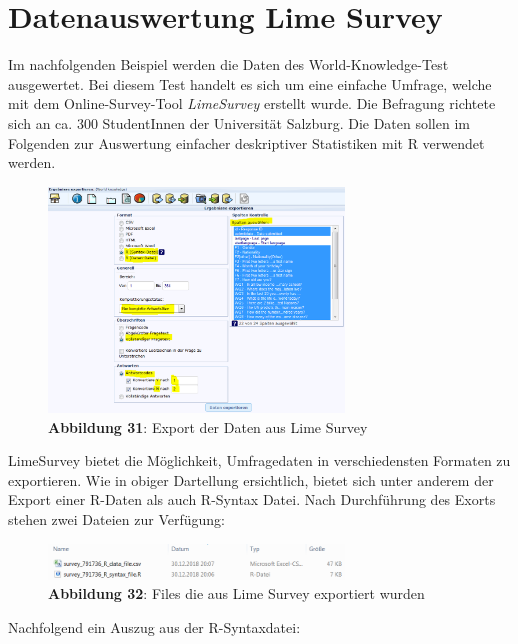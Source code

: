 \documentclass[]{article}
\begin{document}
\section{Datenauswertung Lime Survey}\label{datenauswertung-lime-survey}

Im nachfolgenden Beispiel werden die Daten des World-Knowledge-Test
ausgewertet. Bei diesem Test handelt es sich um eine einfache Umfrage,
welche mit dem Online-Survey-Tool \emph{LimeSurvey} erstellt wurde. Die
Befragung richtete sich an ca. 300 StudentInnen der Universität
Salzburg. Die Daten sollen im Folgenden zur Auswertung einfacher
deskriptiver Statistiken mit R verwendet werden.

\begin{figure}
\centering
\includegraphics[width=0.70000\textwidth]{Images/09_R_LimeSurveyExport.PNG}
\caption{\textbf{Abbildung 31}: Export der Daten aus Lime Survey}
\end{figure}

LimeSurvey bietet die Möglichkeit, Umfragedaten in verschiedensten
Formaten zu exportieren. Wie in obiger Dartellung ersichtlich, bietet
sich unter anderem der Export einer R-Daten als auch R-Syntax Datei.
Nach Durchführung des Exorts stehen zwei Dateien zur Verfügung:

\begin{figure}
\centering
\includegraphics[width=0.70000\textwidth]{Images/09_R_LimeSurveyExportDateien.PNG}
\caption{\textbf{Abbildung 32}: Files die aus Lime Survey exportiert
wurden}
\end{figure}

Nachfolgend ein Auszug aus der R-Syntaxdatei:
\end{document}
